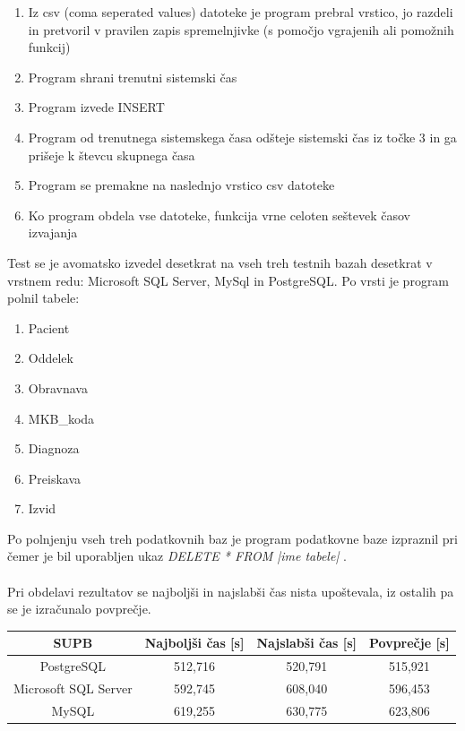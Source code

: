 \documentclass[a4paper,11pt]{report}
\begin{document}
\begin{enumerate}
   \item Iz csv (coma seperated values) datoteke je program prebral vrstico, jo razdeli in pretvoril v pravilen zapis spremelnjivke (s pomočjo vgrajenih ali pomožnih funkcij)
   \item Program shrani trenutni sistemski čas
   \item Program izvede INSERT
   \item Program od trenutnega sistemskega časa odšteje sistemski čas iz točke 3 in ga prišeje k števcu skupnega časa 
   \item Program se premakne na naslednjo vrstico csv datoteke
   \item Ko program obdela vse datoteke, funkcija vrne celoten seštevek časov izvajanja
\end{enumerate}
Test se je avomatsko izvedel desetkrat na vseh treh testnih bazah desetkrat v vrstnem redu: Microsoft SQL Server, MySql in PostgreSQL. Po vrsti je program polnil tabele:
\begin{enumerate}
   \item Pacient
   \item Oddelek
   \item Obravnava
   \item MKB\_koda
   \item Diagnoza
   \item Preiskava
   \item Izvid
\end{enumerate}

Po polnjenju vseh treh podatkovnih baz je program podatkovne baze izpraznil pri čemer je bil uporabljen ukaz \textit{DELETE * FROM |ime tabele| }. 
\\\\
Pri obdelavi rezultatov se najboljši in najslabši čas nista upoštevala, iz ostalih pa se je izračunalo povprečje.

\begin{center}
   \begin{tabular}{||c|c|c|c||}
      \hline
      \textbf{SUPB} & \textbf{Najboljši čas [s]} & \textbf{Najslabši čas [s]} & \textbf{Povprečje [s]} \\
      \hline
      \hline
      PostgreSQL & 512,716 & 520,791 & 515,921 \\
      Microsoft SQL Server & 592,745 & 608,040 & 596,453 \\
      MySQL & 619,255 & 630,775 & 623,806\\
      \hline
   \end{tabular}
\end{center}
\end{document}
